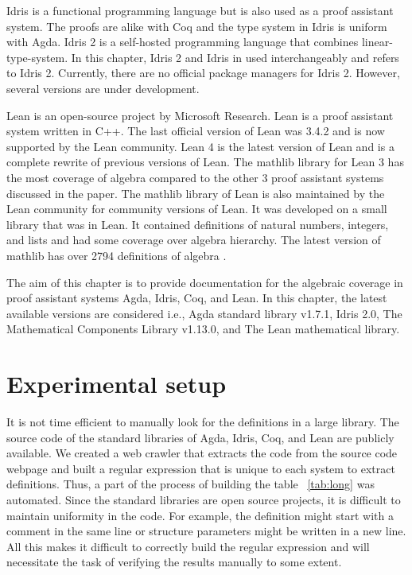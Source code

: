 Idris is a functional programming language but is also used as a proof
assistant system. The proofs are alike with Coq and the type system in Idris is
uniform with Agda. Idris 2 is a self-hosted programming language that combines
linear-type-system. In this chapter, Idris 2 and Idris in used interchangeably
and refers to Idris 2. Currently, there are no official package managers for
Idris 2. However, several versions are under development. 

Lean \cite{10.1145/3372885.3373824} is an open-source project by Microsoft
Research. Lean is a proof assistant system written in C++. The last official
version of Lean was 3.4.2 and is now supported by the Lean community. Lean 4 is
the latest version of Lean and is a complete rewrite of previous versions of
Lean. The mathlib \cite{10.1145/3372885.3373824} library for Lean 3 has the most
coverage of algebra compared to the other 3 proof assistant systems discussed in
the paper. The mathlib library of Lean is also maintained by the Lean community
for community versions of Lean. It was developed on a small library that was in
Lean. It contained definitions of natural numbers, integers, and lists and had
some coverage over algebra hierarchy. The latest version of mathlib has over
2794 definitions of algebra \cite{2019arXiv191203028S}.

The aim of this chapter is to provide documentation for the algebraic coverage
in proof assistant systems Agda, Idris, Coq, and Lean. In this chapter, the
latest available versions are considered i.e., Agda standard library v1.7.1, Idris
2.0, The Mathematical Components Library v1.13.0, and The Lean mathematical
library. 

\section{Experimental setup}
It is not time efficient to manually look for the definitions in a large
library. The source code of the standard libraries of Agda, Idris, Coq, and Lean
are publicly available. We created a web crawler that extracts the code from the
source code webpage and built a regular expression that is unique to each system
to extract definitions. Thus, a part of the process of building the table
~\ref{tab:long} was automated. Since the standard libraries are open source
projects, it is difficult to maintain uniformity in the code. For example, the
definition might start with a comment in the same line or structure parameters
might be written in a new line. All this makes it difficult to correctly build
the regular expression and will necessitate the task of verifying the results
manually to some extent.   

